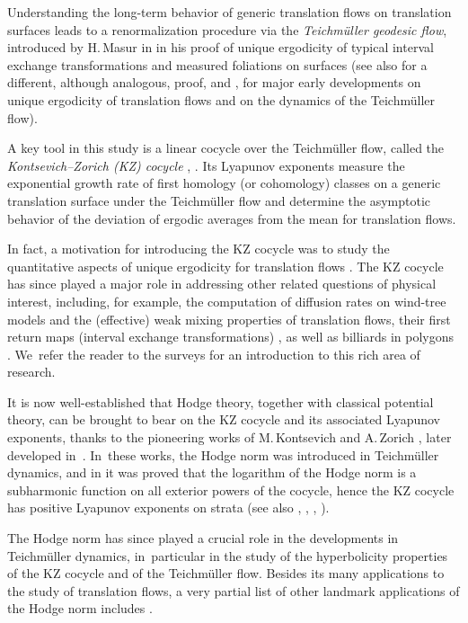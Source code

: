 \documentclass[JEP,XML,SOM,Unicode,published]{cedram}
\theoremstyle{plain}
\theoremstyle{definition}
\numberwithin{equation}{subsection}
\begin{document}
Understanding the long-term behavior of generic translation flows on translation surfaces leads to a renormalization procedure via the \emph{Teichmüller geodesic flow}, introduced by H.\,Masur in \cite{Ma82} in his proof of unique ergodicity of
typical interval exchange transformations and measured foliations on surfaces (see also \cite{Vc82} for a different, although analogous, proof, and \cite{KMS86}, \cite{Vc86} for major early developments on unique ergodicity of translation flows and on the dynamics of the Teichmüller flow).

A key tool in this study is a linear cocycle over the Teichmüller flow, called the \emph{Kontsevich–Zorich (KZ) cocycle} \cite{KZ97}, \cite{Kon97}. Its Lyapunov exponents measure the exponential growth rate of first homology (or cohomology) classes on a generic translation surface under the Teichmüller flow and determine the asymptotic behavior of the deviation of ergodic averages from the mean for translation flows.

In fact, a motivation for introducing the KZ cocycle was to study the quantitative aspects of unique ergodicity for translation flows \cite{Z96,Z97,KZ97, Kon97, For02, AtF08}. The KZ cocycle has since played a major role in addressing other related questions of physical interest, including, for example, the computation of diffusion rates on wind-tree models \cite{DHL14} and the (effective) weak mixing properties of translation flows, their first return maps (interval exchange transformations) \cite{AF04, BS21, For22, AFS23}, as well as billiards in polygons \cite{CF20, AHCF24}. We~refer the reader to the surveys \cite{Z06, FM13, W15, For24} for an introduction to this rich area of research.

It is now well-established that Hodge theory, together with classical potential theory, can be brought to bear on the KZ cocycle and its associated Lyapunov exponents, thanks to the pioneering works of M.\,Kontsevich and A.\,Zorich \cite{KZ97, Kon97}, later developed in~\cite{For02}. In~these works, the Hodge norm was introduced
in Teichmüller dynamics, and in \cite{For02} it was proved that the logarithm of the Hodge norm is a subharmonic function on all exterior powers of the cocycle, hence the KZ cocycle has positive Lyapunov exponents on strata (see also \cite{For06}, \cite{For11}, \cite{FMZ11}, \cite{FMZ12}).

The Hodge norm has since played a crucial role in the developments in Teichmüller dynamics, in~particular in the study of the hyperbolicity properties of the KZ cocycle and of the Teichmüller flow. Besides its many applications to the study of translation flows, a very partial list of other landmark applications of the Hodge norm includes \cite{ABEM12, EKZ14, EMM15,EM18, Fil16a, Fil16b, Fil17}.\enlargethispage{\baselineskip}%
\end{document}
